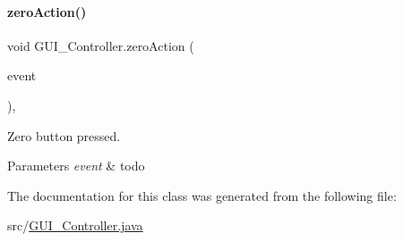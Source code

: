 \paragraph{\texorpdfstring{zero\+Action()}{zeroAction()}}
{\footnotesize\ttfamily void G\+U\+I\+\_\+\+Controller.\+zero\+Action (\begin{DoxyParamCaption}\item[{Action\+Event}]{event }\end{DoxyParamCaption})\hspace{0.3cm}{\ttfamily [inline]}, {\ttfamily [private]}}



Zero button pressed. 


\begin{DoxyParams}{Parameters}
{\em event} & todo \\
\hline
\end{DoxyParams}


The documentation for this class was generated from the following file\+:\begin{DoxyCompactItemize}
\item 
src/\hyperlink{GUI__Controller_8java}{G\+U\+I\+\_\+\+Controller.\+java}\end{DoxyCompactItemize}

